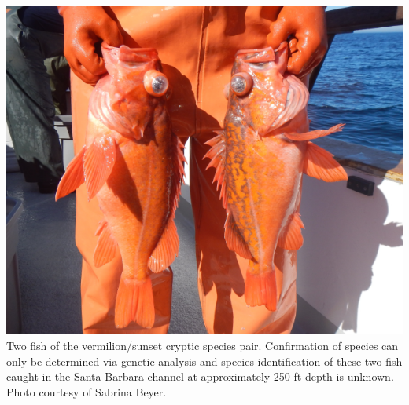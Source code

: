 \documentclass[11pt,
  english,
  a4paper,
]{article}
\begin{document}
\newpage
\thispagestyle{empty} %

\pagestyle{plain}  %
\renewcommand*{\thefootnote}{\arabic{footnote}}  %
\setcounter{footnote}{0}  %
\renewcommand{\headrulewidth}{0.5pt}
\renewcommand{\footrulewidth}{0.5pt}

\newcommand{\lt}{\ensuremath <}
\newcommand{\gt}{\ensuremath >}

\newcommand\CapeM{$40^\circ 10^\prime N$}
\newcommand\PtC{$34^\circ 27^\prime N$}
\newcommand\CAOR{$42^\circ 00^\prime N$}

\newpage

\includegraphics{cover_photo.png} Two fish of the vermilion/sunset cryptic species pair. Confirmation of species can only be determined via genetic analysis and species identification of these two fish caught in the Santa Barbara channel at approximately 250 ft depth is unknown. Photo courtesy of Sabrina Beyer.

\pagebreak
{}
\setcounter{page}{1}

\renewcommand{\thetable}{\roman{table}}
\renewcommand{\thefigure}{\roman{figure}}

\setlength\parskip{0.5em plus 0.1em minus 0.2em}

\end{document}
